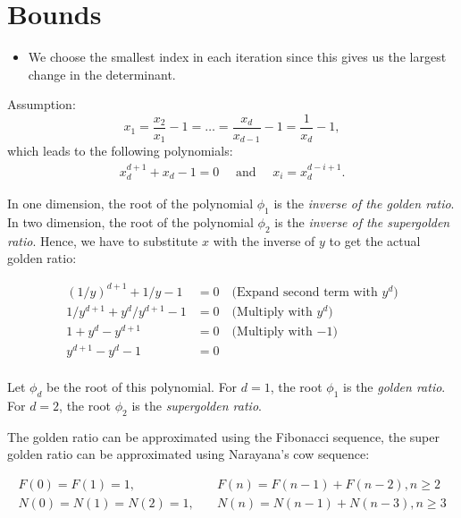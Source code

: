 \documentclass[english,version-2020-11]{uzl-thesis}
\begin{document}

\chapter{Bounds}

\begin{itemize}
  \item We choose the smallest index in each iteration since this gives us the
    largest change in the determinant.
\end{itemize}

Assumption:
\[
  x_1 = \frac{x_2}{x_1} - 1 = \dots = \frac{x_{d}}{x_{d-1}} - 1 = \frac{1}{x_d} - 1,
\]
which leads to the following polynomials:
\begin{align}
  \label{eq:solution}
  x_d^{d+1} + x_d - 1 = 0 \quad \text{ and } \quad x_i = x_d^{d - i + 1}.
\end{align}

In one dimension, the root of the polynomial $\phi_1$ is the \emph{inverse of the golden ratio}.
In two dimension, the root of the polynomial $\phi_2$ is the \emph{inverse of the supergolden ratio}.
Hence, we have to substitute $x$ with the inverse of $y$ to get the actual golden ratio:

\begin{align*}
  (1/y)^{d+1} + 1/y - 1       & = 0 \quad \text{(Expand second term with $y^d$)} \\
  1/y^{d+1} + y^d/y^{d+1} - 1 & = 0 \quad \text{(Multiply with $y^d$)}           \\
  1 + y^d - y^{d+1}           & = 0 \quad \text{(Multiply with $-1$)}            \\
  y^{d+1} - y^d - 1           & = 0                                              \\
\end{align*}

Let $\phi_d$ be the root of this polynomial.
For $d = 1$, the root $\phi_1$ is the \emph{golden ratio}.
For $d = 2$, the root $\phi_2$ is the \emph{supergolden ratio}.

The golden ratio can be approximated using the Fibonacci sequence,
the super golden ratio can be approximated using Narayana's cow sequence:

\begin{align*}
  F(0) = F(1) = 1,        & \quad F(n) = F(n - 1) + F(n - 2), n \ge 2 \\
  N(0) = N(1) = N(2) = 1, & \quad N(n) = N(n - 1) + N(n - 3), n \ge 3
\end{align*}
\end{document}
